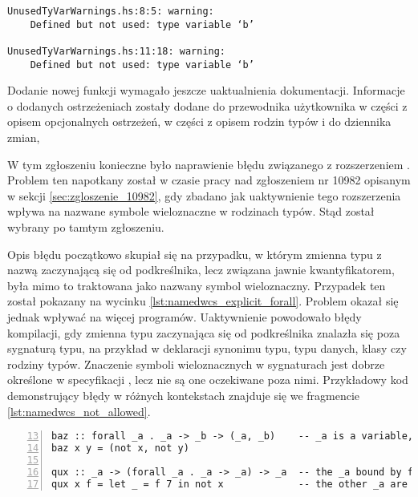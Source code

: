 \begin{lstlisting}[float,language={},label={lst:unused_test_stderr},
                   caption={Ostrzeżenia generowany przez kompilator dla fragmentu \ref{lst:unused_test_code} po wprowadzeniu zmian.}]
UnusedTyVarWarnings.hs:8:5: warning:
    Defined but not used: type variable ‘b’

UnusedTyVarWarnings.hs:11:18: warning:
    Defined but not used: type variable ‘b’
\end{lstlisting}

Dodanie nowej funkcji wymagało jeszcze uaktualnienia dokumentacji. Informacje o dodanych ostrzeżeniach zostały dodane do przewodnika użytkownika w części z opisem opcjonalnych ostrzeżeń, w części z opisem rodzin typów i do dziennika zmian,


\label{sec:zgloszenie_11098}

W tym zgłoszeniu konieczne było naprawienie błędu związanego z rozszerzeniem . Problem ten napotkany został w czasie pracy nad zgłoszeniem nr 10982 opisanym w sekcji \ref{sec:zgloszenie_10982}, gdy zbadano jak uaktywnienie tego rozszerzenia wpływa na nazwane symbole wieloznaczne w rodzinach typów. Stąd został wybrany po tamtym zgłoszeniu.

Opis błędu początkowo skupiał się na przypadku, w którym zmienna typu z nazwą zaczynającą się od podkreślnika, lecz związana jawnie kwantyfikatorem, była mimo to traktowana jako nazwany symbol wieloznaczny. Przypadek ten został pokazany na wycinku \ref{lst:namedwcs_explicit_forall}. Problem okazał się jednak wpływać na więcej programów. Uaktywnienie  powodowało błędy kompilacji, gdy zmienna typu zaczynająca się od podkreślnika znalazła się poza sygnaturą typu, na przykład w deklaracji synonimu typu, typu danych, klasy czy rodziny typów. Znaczenie symboli wieloznacznych w sygnaturach jest dobrze określone w specyfikacji , lecz nie są one oczekiwane poza nimi. Przykładowy kod demonstrujący błędy w różnych kontekstach znajduje się we fragmencie \ref{lst:namedwcs_not_allowed}.

\begin{lstlisting}[float,numbers=left,firstnumber=13,label={lst:namedwcs_explicit_forall},
                   caption={Fragment testu \code{NamedWildcardExplicitForall} sprawdzającego, czy zmienne związane kwantyfikatorem nie zostają zamienione w wieloznaczniki.}]
baz :: forall _a . _a -> _b -> (_a, _b)    -- _a is a variable, _b is a wildcard
baz x y = (not x, not y)

qux :: _a -> (forall _a . _a -> _a) -> _a  -- the _a bound by forall is a tyvar
qux x f = let _ = f 7 in not x             -- the other _a are wildcards
\end{lstlisting}

